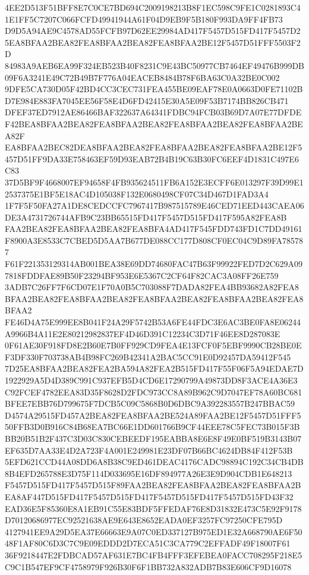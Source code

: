\documentclass[UTF8,fontset=fandol,zihao=-4,a4paper]{ctexart}
\begin{document}
{{4EE2D513F51BFF8E7C0CE7BD694C2009198213B8F1EC598C9FE1C0281893C41E1FF5C7207C066FCFD49941944A61F04D9EB9F5B180F993DA9FF4FB73
D9D5A94AE9C4578AD55FCFB97D62EE29984AD417F5457D515FD417F5457D25EA8BFAA2BEA82FEA8BFAA2BEA82FEA8BFAA2BE12F5457D51FFF5503F2D
84983A9AEB6EA99F324EB523B40F8231C9E43BC50977CB7464EF49476B999DB09F6A3241E49C72B49B7F776A04EACEB8484B78F6BA63C0A32BE0C002
9DFE5CA730D05F42BD4CC3CEC731FEA455BE09EAF78E0A0663D0FE71102BD7E984E883FA7045EE56F58E4D6FD42415E30A5E09F53B7174BB826CB471
DFEF37ED7912AE86466BAF322637A64341FDBC94FCB03B69D7A07E77DFDEF42BEA8BFAA2BEA82FEA8BFAA2BEA82FEA8BFAA2BEA82FEA8BFAA2BEA82F
EA8BFAA2BEC82DEA8BFAA2BEA82FEA8BFAA2BEA82FEA8BFAA2BE12F5457D51FF9DA33E758463EF59D93EAB72B4B19C63B30FC6EEF4D1831C497E6C83
37D5BF9F4668007EF94658F4FB935624511FB6A152E3ECFF6E013297F39D99E12537375E1BF5E18AC4D105038F132E0680498CF07C34D467D1FAD3A4
1F7F5F50FA27A1DE8CEDCCFC7967417B987515789E46CED71EED443CAEA06DE3A4731726744AFB9C23BB65515FD417F5457D515FD417F595A82FEA8B
FAA2BEA82FEA8BFAA2BEA82FEA8BFA4AD417F545FDD743FD1C7DD49161F8900A3E8533C7CBED5D5AA7B677DE088CC177D808CF0EC04C9D89FA785787
F61F221353129314AB001BEA38E69DD74680FAC47B63F99922FED7D2C629A097818FDDFAE89B50F23294BF953E6E5367C2CF64F82CAC3A08FF26E759
3ADB7C26FF7F6CD07E1F70A0B5C703088F7DADA82FEA4BB93682A82FEA8BFAA2BEA82FEA8BFAA2BEA82FEA8BFAA2BEA82FEA8BFAA2BEA82FEA8BFAA2
FE46D4A75E999EE8B041F24A29F5742B53A6FE44FDC3E6AC3BE0FA8E06244A9966B4A11E2E80212982837EF4D46D391C12234C3D71F46EE8D287083E
0F61AE30F918FD8E2B60E7B0FF929CD9FEA4E13FCF0F5EBF9990CB28BE0EF3DF330F703738AB4B98FC269B42341A2BAC5CC91E0D92457DA59412F545
7D25EA8BFAA2BEA82FEA2BA594A82FEA2B515FD417F55F06F5A94EDAE7D1922929A5D4D389C991C937EFB5D4CD6E17290799A49873DD8F3ACE4A36E3
C92FCEF4782EEA83D35F8628D2FDC973CC8A89B962C9D7047EF78A60BC681BFEE7EBB76D799675F7DCB5C09C5868B0D6DBC9A392283557B247BBAC59
D4574A29515FD457A2BEA82FEA8BFAA2BE524A89FAA2BE12F5457D51FFF550FFB3D0B916C84B68EA7BC66E1DD601766B9CF44EEE78C5FEC73B015F3B
BB20B51B2F437C3D03C830CEBEEDF195EABBA8E6E8F49E0BF519B3143B07EF635D7AA33E4D2A723F4A001E249981E23DF07B66BC4624DB84F412F53B
5EFD621CCD44A08DD6A8B38C9ED461DEAC4176CADC98894C192C34CB4DB8B4EFD265788E3D75F114D033695E16DF894977A26E3E9D904CDB1E648213
F5457D515FD417F5457D515F89FAA2BEA82FEA8BFAA2BEA82FEA8BFAA2BEA8AF447D515FD417F5457D515FD417F5457D515FD417F5457D515FD43F32
EAD36E5F85360E8A1EB91C55E83BDF5FFEDAF76E8D31832E473C5E92F9178D70120686977EC92521638AE9E643E8652EADA0EF3257FC97250CFE795D
4127941EE9A29D5EA37E66663E9A07C0ED337127B975ED1E32A668790AE6F5048F1AF80C6D3C7C9E09EDDD2D7ECA51C3CA779C2EFFADF49F18007F61
36F9218447E2FDBCAD57AF631E7BC4FB4FFF3EFEBEA0FACC708295F218E5C9C1B547EF9CF4758979F926B30F6F1BB732A832ADB7B83E606CF9D16078
}}
\end{document}
